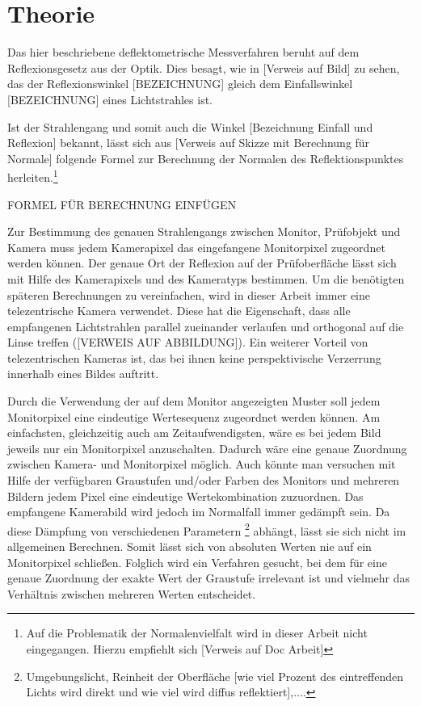 
\chapter{Theorie}{\label{Kap2}}

Das hier beschriebene deflektometrische Messverfahren beruht auf dem Reflexionsgesetz aus der Optik. Dies besagt, wie in [Verweis auf Bild] zu sehen, das der Reflexionswinkel [BEZEICHNUNG] gleich dem Einfallswinkel [BEZEICHNUNG] eines Lichtstrahles ist.

Ist der Strahlengang und somit auch die Winkel [Bezeichnung Einfall und Reflexion] bekannt, lässt sich aus [Verweis auf Skizze mit Berechnung für Normale] folgende Formel zur Berechnung der Normalen des Reflektionspunktes herleiten.\footnote{Auf die Problematik der Normalenvielfalt wird in dieser Arbeit nicht eingegangen. Hierzu empfiehlt sich [Verweis auf Doc Arbeit]}

 
FORMEL FÜR BERECHNUNG EINFÜGEN


Zur Bestimmung des genauen Strahlengangs zwischen Monitor, Prüfobjekt und Kamera muss jedem Kamerapixel das eingefangene Monitorpixel zugeordnet werden können. Der genaue Ort der Reflexion auf der Prüfoberfläche lässt sich mit Hilfe des Kamerapixels und des Kameratyps bestimmen. Um die benötigten späteren Berechnungen zu vereinfachen, wird in dieser Arbeit immer eine telezentrische Kamera verwendet. Diese hat die Eigenschaft, dass alle empfangenen Lichtstrahlen parallel zueinander verlaufen und orthogonal auf die Linse treffen ([VERWEIS AUF ABBILDUNG]). Ein weiterer Vorteil von telezentrischen Kameras ist, das bei ihnen keine perspektivische Verzerrung innerhalb eines Bildes auftritt.

Durch die Verwendung der auf dem Monitor angezeigten Muster soll jedem Monitorpixel eine eindeutige Wertesequenz zugeordnet werden können. Am einfachsten, gleichzeitig auch am Zeitaufwendigsten, wäre es bei jedem Bild jeweils nur ein Monitorpixel anzuschalten. Dadurch wäre eine genaue Zuordnung zwischen Kamera- und Monitorpixel möglich. Auch könnte man versuchen mit Hilfe der verfügbaren Graustufen und/oder Farben des Monitors und mehreren Bildern jedem Pixel eine eindeutige Wertekombination zuzuordnen. Das empfangene Kamerabild wird jedoch im Normalfall immer gedämpft sein. Da diese Dämpfung von verschiedenen Parametern \footnote{Umgebungslicht, Reinheit der Oberfläche [wie viel Prozent des eintreffenden Lichts wird direkt und wie viel wird diffus reflektiert],....} abhängt, lässt sie sich nicht im allgemeinen Berechnen. Somit lässt sich von absoluten Werten nie auf ein Monitorpixel schließen. Folglich wird ein Verfahren gesucht, bei dem für eine genaue Zuordnung der exakte Wert der Graustufe irrelevant ist und vielmehr das Verhältnis zwischen mehreren Werten entscheidet.

